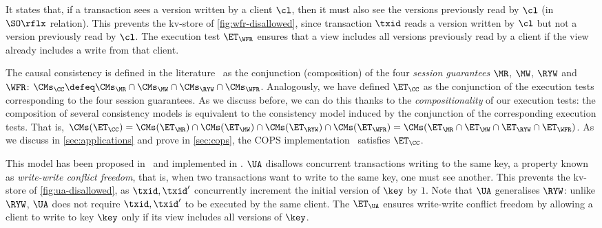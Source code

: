 

It states that, if a transaction sees a version written by a
client $\cl$, then it must also see the versions previously read by $\cl$ (in $\SO\rflx$ relation).
This prevents the kv-store of \cref{fig:wfr-disallowed},
since transaction $\txid$ reads a version written by $\cl$ but
not a version previously read by $\cl$.
The execution test $\ET_{\WFR}$ ensures
that a view includes all versions previously read by a client 
if the view already includes a write from that client. 

The causal consistency is defined in the literature~\cite{session2causal} 
as the conjunction (composition) of the four \emph{session guarantees} \(\MR\), \(\MW\), \(\RYW\) and \(\WFR\):   
$\CMs_{\CC} \defeq \CMs_{\MR} \cap \CMs_{\MW} \cap \CMs_{\RYW} \cap \CMs_{\WFR}$. 
Analogously, we have defined $\ET_\CC$ as the conjunction of the execution tests corresponding to the four session guarantees.
As we discuss before, we can do this thanks to the \emph{compositionality} of our execution tests:
the composition of several consistency models is equivalent to the consistency model induced by the conjunction of the corresponding execution tests. 
That is, $\CMs(\ET_\CC) = \CMs(\ET_{\MR}) \cap \CMs(\ET_{\MW}) \cap
\CMs(\ET_{\RYW}) \cap \CMs(\ET_{\WFR}) = \CMs(\ET_{\MR} \cap
\ET_{\MW} \cap \ET_{\RYW} \cap \ET_{\WFR})$.
As we discuss in \cref{sec:applications} and prove in \ref{sec:cops}, the COPS
implementation~\cite{cops} satisfies $\ET_{\CC}$. 

This model has been proposed in~\cite{framework-concur} 
and implemented in \cite{rola}.
$\UA$ disallows concurrent transactions writing to the same key,
a property known as \emph{write-write conflict freedom}, that is, 
when two transactions want to write to the same key, one must see another.
This prevents the kv-store of \cref{fig:ua-disallowed},
as $\txid, \txid'$ concurrently increment the initial version of $\key$ by $1$.
Note that $\UA$ generalises $\RYW$: unlike $\RYW$, $\UA$ does not require $\txid, \txid'$ to be executed by the same client.
The $\ET_\UA$ ensures write-write conflict freedom by allowing a client to write to key $\key$
only if its view includes all versions of $\key$.

